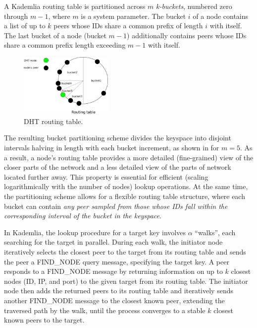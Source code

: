 A Kademlia routing table is partitioned across $m$ \textit{k-buckets}, numbered zero through $m-1$, where $m$ is a system parameter. The bucket $i$ of a node contains a list of up to $k$ peers whose IDs share a common prefix of length $i$ with itself. The last bucket of a node (\ie bucket $m-1$) additionally contains peers whose IDs share a common prefix length exceeding $m-1$ with itself. %

\begin{figure}
    \includegraphics[width=0.4\textwidth]{img/kademlia}
    \caption{DHT routing table.}
    \label{fig:kademlia}
 \end{figure}

The resulting bucket partitioning scheme divides the keyspace into disjoint intervals halving in length with each bucket increment, as shown in  for $m=5$. As a result, a node's routing table provides a more detailed (\ie fine-grained) view of the closer parts of the network and a less detailed view of the parts of network located further away. This property is essential for efficient (\ie scaling logarithmically with the number of nodes) lookup operations. At the same time, the partitioning scheme allows for a flexible routing table structure, where each bucket can contain \textit{any peer sampled from those whose IDs fall within the corresponding interval of the bucket in the keyspace}.

In Kademlia, the lookup procedure for a target key involves $\alpha$ ``walks'', each searching for the target in parallel. During each walk, the initiator node iteratively selects the closest peer to the target from its routing table and sends the peer a FIND\_NODE query message, specifying the target key. A peer responds to a FIND\_NODE message by returning information on up to $k$ closest nodes (\ie ID, IP, and port) to the given target from its routing table. The initiator node then adds the returned peers to its routing table and iteratively sends another FIND\_NODE message to the closest known peer, extending the traversed path by the walk, until the process converges to a stable $k$ closest known peers to the target. %

